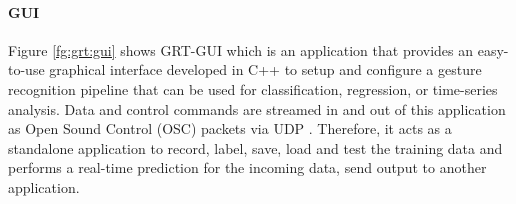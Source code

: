 \paragraph*{GUI} Figure \ref{fg:grt:gui} shows GRT-GUI which is an application that provides an easy-to-use graphical interface developed in C++ to setup and configure a gesture recognition pipeline that can be used for classification, regression, or time-series analysis. Data and control commands are streamed in and out of this application as Open Sound Control (OSC) packets via UDP . Therefore, it acts as a standalone application to record, label, save, load and test the training data and performs a real-time prediction for the incoming data, send output to another application. 

 
